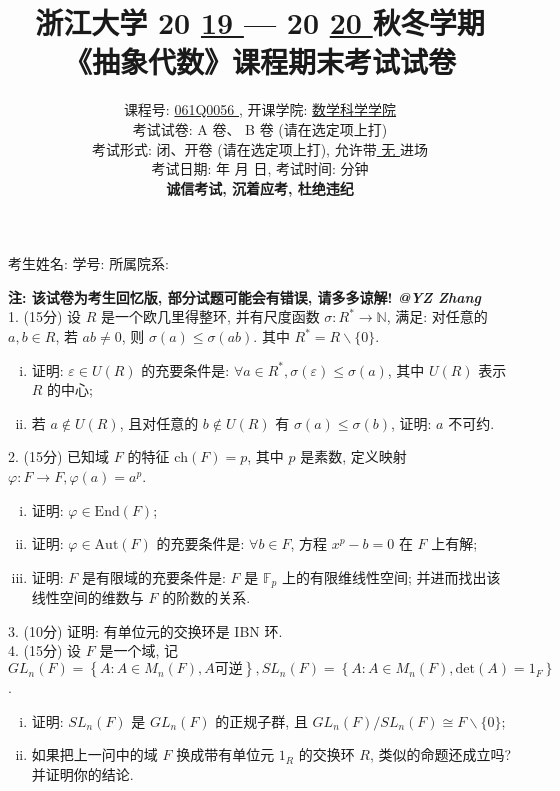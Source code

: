 \documentclass[UTF8]{ctexart}
\title{
\textbf{浙江大学 }20 \underline{ 19 } — 20 \underline{ 20 } \textbf{秋冬学期} \\
\textbf{《抽象代数》课程期末考试试卷}
}
\author{
课程号: \underline{ \quad 061Q0056 \quad }, 开课学院: \underline{ \quad 数学科学学院 \quad } \\
考试试卷: \checkmark A 卷、 B 卷 (请在选定项上打\checkmark) \\
考试形式: \checkmark 闭、开卷 (请在选定项上打\checkmark), 允许带\underline{ \quad 无 \quad  }进场 \\
考试日期: \underline{ \quad 2020 \quad } 年 \underline{ \quad 01 \quad } 月 \underline{ \quad 17 \quad } 日, 考试时间: \underline{ \quad 120 \quad }分钟 \\
\textbf{诚信考试, 沉着应考, 杜绝违纪}
}
\date{}
\begin{document}
\maketitle

\begin{center}
考生姓名: \underline{\quad\quad\quad\quad\quad\quad\quad\quad\quad\quad}  学号: \underline{\quad\quad\quad\quad\quad\quad\quad\quad\quad\quad}  所属院系: \underline{\quad\quad\quad\quad\quad\quad\quad\quad\quad\quad}
\end{center}

\textbf{注: 该试卷为考生回忆版, 部分试题可能会有错误, 请多多谅解! \textit{@YZ Zhang}}
\\

1. (15分) 设 $R$ 是一个欧几里得整环, 并有尺度函数 $\sigma:R^*\rightarrow\mathbb{N}$, 满足: 对任意的 $a,b\in R$, 若 $ab\neq0$, 则 $\sigma(a)\le\sigma(ab)$. 其中 $R^*=R\backslash\{0\}$.
\begin{enumerate}[(i)]
  \item 证明: $\varepsilon\in U(R)$ 的充要条件是: $\forall a\in R^*, \sigma(\varepsilon)\le\sigma(a)$, 其中 $U(R)$ 表示 $R$ 的中心;
  \item 若 $a\notin U(R)$, 且对任意的 $b\notin U(R)$ 有 $\sigma(a)\le\sigma(b)$, 证明: $a$ 不可约.\\
\end{enumerate}

2. (15分) 已知域 $F$ 的特征 $\text{ch}(F)=p$, 其中 $p$ 是素数, 定义映射 $\varphi:F\rightarrow F, \varphi(a)=a^p$.
\begin{enumerate}[(i)]
  \item 证明: $\varphi\in\text{End}(F)$;
  \item 证明: $\varphi\in\text{Aut}(F)$ 的充要条件是: $\forall b\in F$, 方程 $x^p-b=0$ 在 $F$ 上有解;
  \item 证明: $F$ 是有限域的充要条件是: $F$ 是 $\mathbb{F}_p$ 上的有限维线性空间; 并进而找出该线性空间的维数与 $F$ 的阶数的关系.\\
\end{enumerate}

3. (10分) 证明: 有单位元的交换环是  IBN 环.
\\

4. (15分) 设 $F$ 是一个域, 记 $\displaystyle GL_n(F)=\left\{A:A\in M_n(F), A\text{可逆}\right\}, SL_n(F)=\left\{A:A\in M_n(F), \text{det}(A)=1_F\right\}$.
\begin{enumerate}[(i)]
  \item 证明: $SL_n(F)$ 是 $GL_n(F)$ 的正规子群, 且 $GL_n(F)/SL_n(F)\cong F\backslash\{0\}$;
  \item 如果把上一问中的域 $F$ 换成带有单位元 $1_R$ 的交换环 $R$, 类似的命题还成立吗? 并证明你的结论.\\
\end{enumerate}
\end{document}
